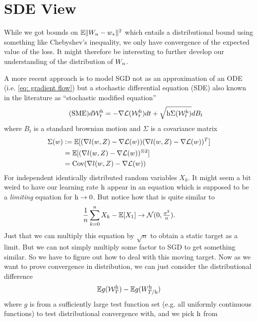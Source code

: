 \section{SDE View}

While we got bounds on \(\mathbb{E}\|W_n - w_*\|^2\) which entails a
distributional bound using something like Chebyshev's inequality, we only
have convergence of the expected value of the loss. It might therefore be
interesting to further develop our understanding of the distribution of \(W_n\).

A more recent approach is to model SGD not as an approximation of an ODE (i.e.
\ref{eq: gradient flow}) but a stochastic differential equation (SDE) also known
in the literature as ``stochastic modified equation''
\begin{align}
	\tag{SME}
	d\mathcal{W}_t^{\text{h}}
	= -\nabla\mathcal{L}(\mathcal{W}_t^{\text{h}})dt
	+ \sqrt{\text{h} \Sigma(\mathcal{W}_t^{\text{h}})}dB_t
\end{align}
where \(B_t\) is a standard brownian motion and \(\Sigma\) is a covariance
matrix
\begin{align*}
	\Sigma(w)
	&:= \mathbb{E}[(\nabla l(w,Z) - \nabla\mathcal{L}(w))(\nabla l(w,Z) - \nabla\mathcal{L}(w))^T]\\
	&= \mathbb{E}[(\nabla l(w,Z) - \nabla\mathcal{L}(w))^{\otimes 2}]\\
	&= \text{Cov}(\nabla l(w,Z) - \nabla\mathcal{L}(w))
\end{align*}
%
For independent identically distributed random variables \(X_k\). It might seem
a bit weird to have our learning rate \(\text{h}\) appear in an equation which is
supposed to be a \emph{limiting} equation for \(\text{h}\to 0\). But notice how that
is quite similar to
\begin{align*}
	\frac{1}n\sum_{k=0}^n X_k - \mathbb{E}[X_1] \to \mathcal{N}(0, \tfrac{\sigma^2}{n}).
\end{align*}
Just that we can multiply this equation by \(\sqrt{n}\) to obtain a static 
target as a limit. But we can not simply multiply some factor to SGD to get
something similar. So we have to figure out how to deal with this moving target.
Now as we want to prove convergence in distribution, we can just consider the
distributional difference
\begin{align*}
	\mathbb{E} g(\mathcal{W}_T^{\text{h}}) - \mathbb{E} g(W^{\text{h}}_{T/\text{h}})
\end{align*}
where \(g\) is from a sufficiently large test function set (e.g. all uniformly continuous functions)
to test distributional convergence with, and we pick \(\text{h}\) from
